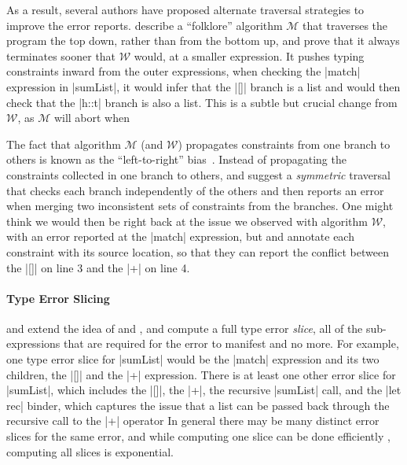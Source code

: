 As a result, several authors have proposed alternate traversal
strategies to improve the error reports.
%
\citet{Lee1998-ys} describe a ``folklore'' algorithm $\mathcal{M}$ that
traverses the program the top down, rather than from the bottom up, and
prove that it always terminates sooner that $\mathcal{W}$ would, \ie
at a smaller expression.
%
It pushes typing constraints inward from the outer expressions, \eg when
checking the |match| expression in |sumList|, it would infer that the
|[]| branch is a list and would then check that the |h::t| branch is
also a list.
%
This is a subtle but crucial change from $\mathcal{W}$, as $\mathcal{M}$
will abort when 

The fact that algorithm $\mathcal{M}$ (and $\mathcal{W}$) propagates
constraints from one branch to others is known as the ``left-to-right''
bias~\citep{McAdam1998-ub}.
%
Instead of propagating the constraints collected in one branch to
others, \citet{McAdam1998-ub} and \citet{Yang1999-yr} suggest a
\emph{symmetric} traversal that checks each branch independently of the
others and then reports an error when merging two inconsistent sets of
constraints from the branches.
%
One might think we would then be right back at the issue we observed
with algorithm $\mathcal{W}$, with an error reported at the |match|
expression, but \citeauthor{McAdam1998-ub} and \citeauthor{Yang1999-yr}
annotate each constraint with its source location, so that they can
report the conflict between the |[]| on line 3 and the |+|  on
line 4.

\paragraph{Type Error Slicing}
\citet{Tip2001-qp} and \citet{Haack2003-vc} extend the idea of
\citeauthor{McAdam1998-ub} and \citeauthor{Yang1999-yr}, and compute a
full type error \emph{slice}, \ie all of the sub-expressions that are
required for the error to manifest and no more.
%
For example, one type error slice for |sumList| would be the |match|
expression and its two children, the |[]| and the |+| expression.
%
There is at least one other error slice for |sumList|, which includes
the |[]|, the |+|, the recursive |sumList| call, and the |let rec|
binder, which captures the issue that a list can be passed back through
the recursive call to the |+| operator
%
In general there may be many distinct error slices for the same error,
and while computing one slice can be done efficiently ,
computing all slices is exponential.

